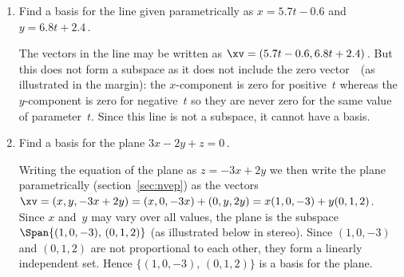 \begin{example}
\begin{enumerate}
\item Find a basis for the line given parametrically as \(x=5.7t-0.6\) and \(y=6.8t+2.4\)\,.
\begin{solution} 
The vectors in the line may be written as \(\xv=(5.7t-0.6,6.8t+2.4)\)\,.
But this does not form a subspace as it does not include the zero vector~\ov\ (as illustrated in the margin): 
the \(x\)-component is zero for positive~\(t\) whereas the \(y\)-component is zero for negative~\(t\) so they are never zero for the same value of parameter~\(t\).
Since this line is not a subspace, it cannot have a basis.
\end{solution}




\item Find a basis for the plane \(3x-2y+z=0\)\,.
\begin{solution} 
Writing the equation of the plane as \(z=-3x+2y\) we then write the plane parametrically (section~\ref{sec:nvep}) as the vectors \(\xv=(x,y,-3x+2y) =(x,0,-3x)+(0,y,2y) =x(1,0,-3) +y(0,1,2)\).
Since \(x\) and~\(y\) may vary over all values, the plane is the subspace \(\Span\{(1,0,-3),\,(0,1,2)\}\) (as illustrated below in stereo).
Since \((1,0,-3)\) and \((0,1,2)\) are not proportional to each other, they form a linearly independent set.
Hence \(\{(1,0,-3),\,(0,1,2)\}\) is a basis for the plane.
\begin{center}
 {}
\end{center}
\end{solution}





\end{enumerate}
\end{example}
